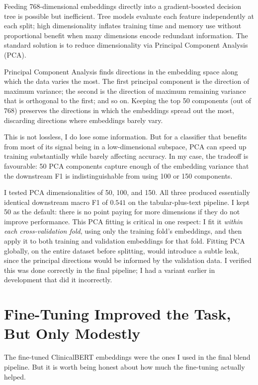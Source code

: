 Feeding 768-dimensional embeddings directly into a gradient-boosted decision tree is possible but inefficient. Tree models evaluate each feature independently at each split; high dimensionality inflates training time and memory use without proportional benefit when many dimensions encode redundant information. The standard solution is to reduce dimensionality via Principal Component Analysis (PCA).

\begin{notebox}
Principal Component Analysis finds directions in the embedding space along which the data varies the most. The first principal component is the direction of maximum variance; the second is the direction of maximum remaining variance that is orthogonal to the first; and so on. Keeping the top 50 components (out of 768) preserves the directions in which the embeddings spread out the most, discarding directions where embeddings barely vary.

This is not lossless, I do lose some information. But for a classifier that benefits from most of its signal being in a low-dimensional subspace, PCA can speed up training substantially while barely affecting accuracy. In my case, the tradeoff is favourable: 50 PCA components capture enough of the embedding variance that the downstream F1 is indistinguishable from using 100 or 150 components.
\end{notebox}

I tested PCA dimensionalities of 50, 100, and 150. All three produced essentially identical downstream macro F1 of $0.541$ on the tabular-plus-text pipeline. I kept 50 as the default: there is no point paying for more dimensions if they do not improve performance. This PCA fitting is critical in one respect: I fit it \emph{within each cross-validation fold}, using only the training fold's embeddings, and then apply it to both training and validation embeddings for that fold. Fitting PCA globally, on the entire dataset before splitting, would introduce a subtle leak, since the principal directions would be informed by the validation data. I verified this was done correctly in the final pipeline; I had a variant earlier in development that did it incorrectly.

\section{Fine-Tuning Improved the Task, But Only Modestly}

The fine-tuned ClinicalBERT embeddings were the ones I used in the final blend pipeline. But it is worth being honest about how much the fine-tuning actually helped.

